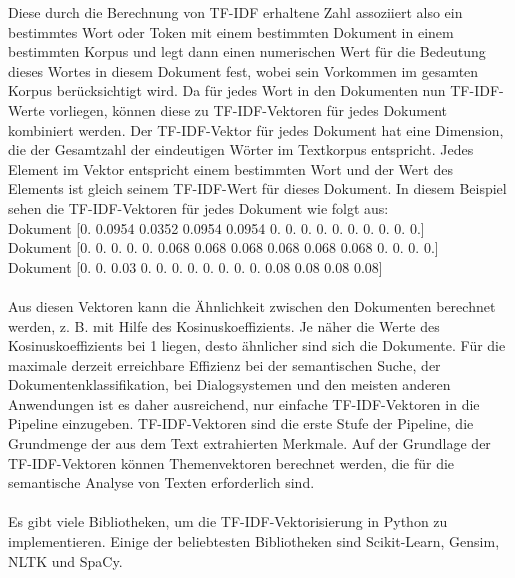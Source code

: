 Diese durch die Berechnung von \ac{TF-IDF} erhaltene Zahl assoziiert also ein bestimmtes Wort oder Token mit einem bestimmten Dokument in einem bestimmten Korpus und legt dann einen numerischen Wert für die Bedeutung dieses Wortes in diesem Dokument fest, wobei sein Vorkommen im gesamten Korpus berücksichtigt wird. 
Da für jedes Wort in den Dokumenten nun \ac{TF-IDF}-Werte vorliegen, können diese zu \ac{TF-IDF}-Vektoren für jedes Dokument kombiniert werden. 
Der \ac{TF-IDF}-Vektor für jedes Dokument hat eine Dimension, die der Gesamtzahl der eindeutigen Wörter im Textkorpus entspricht. 
Jedes Element im Vektor entspricht einem bestimmten Wort und der Wert des Elements ist gleich seinem \ac{TF-IDF}-Wert für dieses Dokument. 
In diesem Beispiel sehen die \ac{TF-IDF}-Vektoren für jedes Dokument wie folgt aus:\\
Dokument  [0. 0.0954 0.0352 0.0954 0.0954 0. 0. 0. 0. 0. 0. 0. 0. 0. 0.]\\
Dokument  [0. 0. 0. 0. 0. 0.068 0.068 0.068 0.068 0.068 0.068 0. 0. 0. 0.]\\
Dokument  [0. 0. 0.03 0. 0. 0. 0. 0. 0. 0. 0. 0.08 0.08 0.08 0.08]\\\\
Aus diesen Vektoren kann die Ähnlichkeit zwischen den Dokumenten berechnet werden, z. B. mit Hilfe des Kosinuskoeffizients. 
Je näher die Werte des Kosinuskoeffizients bei 1 liegen, desto ähnlicher sind sich die Dokumente. 
Für die maximale derzeit erreichbare Effizienz bei der semantischen Suche, der Dokumentenklassifikation, bei Dialogsystemen und den meisten anderen Anwendungen ist es daher ausreichend, nur einfache \ac{TF-IDF}-Vektoren in die Pipeline einzugeben. 
\ac{TF-IDF}-Vektoren sind die erste Stufe der Pipeline, die Grundmenge der aus dem Text extrahierten Merkmale. 
Auf der Grundlage der \ac{TF-IDF}-Vektoren können Themenvektoren berechnet werden, die für die semantische Analyse von Texten erforderlich sind. \cite{lane_natural_2019}\\\\
Es gibt viele Bibliotheken, um die \ac{TF-IDF}-Vektorisierung in Python zu implementieren. 
Einige der beliebtesten Bibliotheken sind Scikit-Learn, Gensim, \ac{NLTK} und SpaCy.
